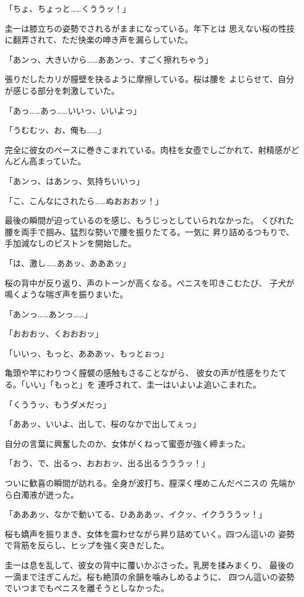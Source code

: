 ﻿\documentclass[
    book,tate,
    line_length=30zw,
    jafontsize=12pt,
    paper=b5j,
    landscape,
    ]{jlreq}
\begin{document}
「ちょ、ちょっと……くううッ！」

圭一は膝立ちの姿勢でされるがままになっている。年下とは
思えない桜の性技に翻弄されて、ただ快楽の呻き声を漏らしていた。

「あンっ、大きいから……ああンっ、すごく擦れちゃう」

張りだしたカリが膣壁を抉るように摩擦している。桜は腰を
よじらせて、自分が感じる部分を刺激していた。

「あっ……あっ……いいっ、いいよっ」

「うむむッ、お、俺も……」

完全に彼女のペースに巻きこまれている。肉柱を女壺でしごかれて、射精感がどんどん高まっていた。

「あンっ、はあンっ、気持ちいいっ」

「こ、こんなにされたら……ぬおおおッ！」

最後の瞬間が迫っているのを感じ、もうじっとしていられなかった。
くびれた腰を両手で掴み、猛烈な勢いで腰を振りたてる。一気に
昇り詰めるつもりで、手加減なしのピストンを開始した。

「は、激し……ああッ、あああッ」

桜の背中が反り返り、声のトーンが高くなる。ペニスを叩きこむたび、
子犬が鳴くような喘ぎ声を振りまいた。

「あンっ……あンっ……」

「おおおッ、くおおおッ」

「いいっ、もっと、あああッ、もっとぉっ」

亀頭や竿にわりつく膣襞の感触もさることながら、
彼女の声が性感をりたてる。「いい」「もっと」を
連呼されて、圭一はいよいよ追いこまれた。

「くううッ、もうダメだっ」

「ああッ、いいよ、出して、桜のなかで出してぇっ」

自分の言葉に興奮したのか、女体がくねって蜜壺が強く締まった。

「おう、で、出るっ、おおおッ、出る出るうううッ！」

ついに歓喜の瞬間が訪れる。全身が波打ち、膣深く埋めこんだペニスの
先端から白濁液が迸った。

「あああッ、なかで動いてる、ひあああッ、イクッ、イクうううッ！」

桜も嬌声を振りまき、女体を震わせながら昇り詰めていく。四つん這いの
姿勢で背筋を反らし、ヒップを強く突きだした。

圭一は息を乱して、彼女の背中に覆いかぶさった。乳房を揉みまくり、
最後の一滴まで注ぎこんだ。桜も絶頂の余韻を噛みしめるように、
四つん這いの姿勢でいつまでもペニスを離そうとしなかった。
\end{document}
